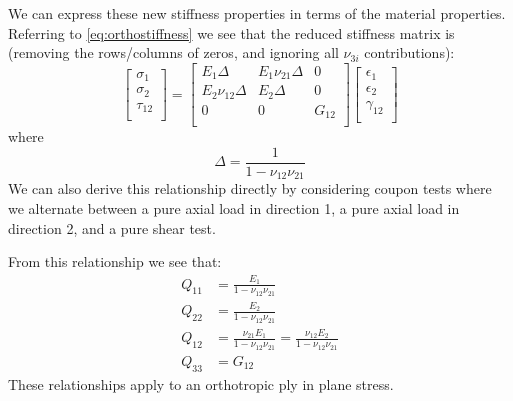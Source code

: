\documentclass{article}
\begin{document}
We can express these new stiffness properties in terms of the material properties.  Referring to \cref{eq:orthostiffness} we see that the reduced stiffness matrix is (removing the rows/columns of zeros, and ignoring all $\nu_{3i}$ contributions):
\begin{equation}
\left[
\begin{matrix}
\sigma_{1}\\
\sigma_{2}\\
\tau_{12}\\
\end{matrix}
\right]
=
\left[
\begin{matrix}
E_1 \Delta & E_1 \nu_{21} \Delta &  0 \\
E_2 \nu_{12} \Delta & E_2 \Delta & 0 \\
0 & 0 & G_{12} \\
\end{matrix}
\right]
\left[
\begin{matrix}
\epsilon_{1}\\
\epsilon_{2}\\
\gamma_{12}\\
\end{matrix}
\right]
\end{equation}
where
\begin{equation}
\Delta = \frac{1}{1 - \nu_{12}\nu_{21}}
\end{equation}
We can also derive this relationship directly by considering coupon tests where we alternate between a pure axial load in direction 1, a pure axial load in direction 2, and a pure shear test.

From this relationship we see that:
\begin{align}
Q_{11} &= \frac{E_1}{1 - \nu_{12}\nu_{21}}\\
Q_{22} &= \frac{E_2}{1 - \nu_{12}\nu_{21}}\\
Q_{12} &= \frac{\nu_{21}E_1}{1 - \nu_{12}\nu_{21}} = \frac{\nu_{12}E_2}{1 - \nu_{12}\nu_{21}}\\
Q_{33} &= G_{12}
\end{align}
These relationships apply to an orthotropic ply in plane stress.
\end{document}
